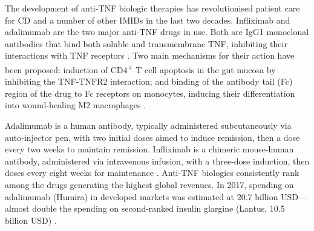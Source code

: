 The development of anti-\gls{TNF} biologic therapies has revolutionised patient care for \gls{CD} and a number of other \glspl{IMID} in the last two decades.
Infliximab and adalimumab are the two major anti-\gls{TNF} drugs in use.
Both are IgG1 monoclonal antibodies that bind both soluble and transmembrane \gls{TNF}, inhibiting their interactions with \gls{TNF} receptors \autocite{lichtenstein2013ComprehensiveReviewAntitumor,adegbola2018AntiTNFTherapyCrohn}.
Two main mechanisms for their action have been proposed: induction of CD4\textsuperscript{+} T cell apoptosis in the gut mucosa by inhibiting the \gls{TNF}-TNFR2 interaction; and binding of the antibody tail (Fc) region of the drug to Fc receptors on monocytes, inducing their differentiation into wound-healing M2 macrophages \autocite{levin2016MechanismActionAntiTNF}.

Adalimumab is a human antibody, typically administered subcutaneously via auto-injector pen, with two initial doses aimed to induce remission, then a dose every two weeks to maintain remission. 
Infliximab is a chimeric mouse-human antibody, administered via intravenous infusion, with a three-dose induction, then doses every eight weeks for maintenance \autocite{adegbola2018AntiTNFTherapyCrohn}.
Anti-\gls{TNF} biologics consistently rank among the drugs generating the highest global revenues.
In 2017, spending on adalimumab (Humira) in developed markets was estimated at 20.7 billion USD---almost double the spending on second-ranked insulin glargine (Lantus, 10.5 billion USD) \autocite{aitken2019GlobalUseMedicine}.

